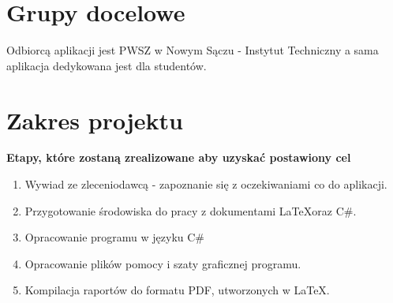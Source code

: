 \section{Grupy docelowe}
Odbiorcą aplikacji jest PWSZ w Nowym Sączu - Instytut Techniczny a sama aplikacja dedykowana jest dla studentów. 

\section{Zakres projektu}
\textbf{Etapy, które zostaną zrealizowane aby uzyskać postawiony cel}
\begin{enumerate}
\item Wywiad ze zleceniodawcą - zapoznanie się z oczekiwaniami co do aplikacji.
\item Przygotowanie środowiska do pracy z dokumentami \LaTeX oraz C\#.
\item Opracowanie programu w języku C\#
\item Opracowanie plików pomocy i szaty graficznej programu.
\item Kompilacja raportów do formatu PDF, utworzonych w \LaTeX. 
\end{enumerate}


